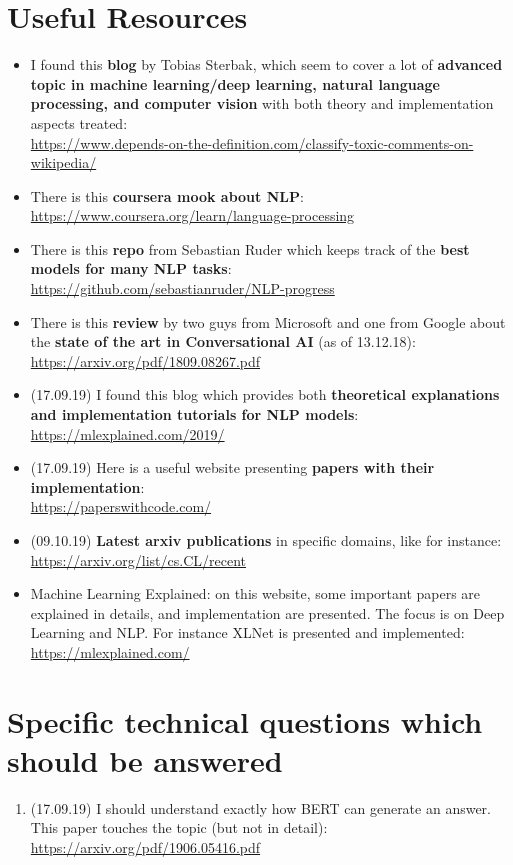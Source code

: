 \documentclass[11pt,a4paper]{article}
\begin{document}
\section{Useful Resources}
\begin{itemize}
\item I found this \textbf{blog} by Tobias Sterbak, which seem to cover a lot of \textbf{advanced topic in machine learning/deep learning, natural language processing, and computer vision} with both theory and implementation aspects treated:\\
\url{https://www.depends-on-the-definition.com/classify-toxic-comments-on-wikipedia/}
\item There is this \textbf{coursera mook about NLP}:\\
\url{https://www.coursera.org/learn/language-processing}
\item There is this \textbf{repo} from Sebastian Ruder which keeps track of the \textbf{best models for many NLP tasks}:\\
\url{https://github.com/sebastianruder/NLP-progress}
\item There is this \textbf{review} by two guys from Microsoft and one from Google about the \textbf{state of the art in Conversational AI} (as of 13.12.18):\\
\url{https://arxiv.org/pdf/1809.08267.pdf}
\item (17.09.19) I found this blog which provides both \textbf{theoretical explanations and implementation tutorials for NLP models}:\\
\url{https://mlexplained.com/2019/}
\item (17.09.19) Here is a useful website presenting \textbf{papers with their implementation}:\\
\url{https://paperswithcode.com/}
\item (09.10.19) \textbf{Latest arxiv publications} in specific domains, like for instance:\\
\url{https://arxiv.org/list/cs.CL/recent}
\item Machine Learning Explained: on this website, some important papers are explained in details, and implementation are presented. The focus is on Deep Learning and NLP. For instance XLNet is presented and implemented:\\
\url{https://mlexplained.com/}
\end{itemize}

\section{Specific technical questions which should be answered}
\begin{enumerate}
\item (17.09.19) I should understand exactly how BERT can generate an answer. This paper touches the topic (but not in detail):\\
\url{https://arxiv.org/pdf/1906.05416.pdf}
\end{enumerate}
\end{document}
